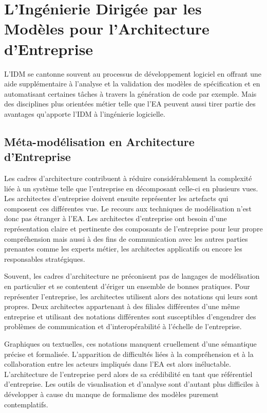 \section{L'Ingénierie Dirigée par les Modèles pour l'Architecture d'Entreprise}

L'IDM se cantonne souvent au processus de développement logiciel en offrant une aide supplémentaire à l'analyse et la validation des modèles de spécification et en automatisant certaines tâches à travers la génération de code par exemple. Mais des disciplines plus orientées métier telle que l'EA peuvent aussi tirer partie des avantages qu'apporte l'IDM à l'ingénierie logicielle. 

\subsection{Méta-modélisation en Architecture d'Entreprise}

Les cadres d'architecture contribuent à réduire considérablement la complexité liée à un système telle que l'entreprise en décomposant celle-ci en plusieurs vues. Les architectes d'entreprise doivent ensuite représenter les artefacts qui composent ces différentes vue. Le recours aux techniques de modélisation n'est donc pas étranger à l'EA. Les architectes d'entreprise ont besoin d'une représentation claire et pertinente des composants de l'entreprise pour leur propre compréhension mais aussi à des fins de communication avec les autres parties prenantes comme les experts métier, les architectes applicatifs ou encore les responsables stratégiques. 

Souvent, les cadres d'architecture ne préconisent pas de langages de modélisation en particulier et se contentent d'ériger un ensemble de bonnes pratiques. Pour représenter l'entreprise, les architectes utilisent alors des notations qui leurs sont propres. Deux architectes appartenant à des filiales différentes d'une même entreprise et utilisant des notations différentes sont susceptibles d'engendrer des problèmes de communication et d'interopérabilité à l'échelle de l'entreprise. 

Graphiques ou textuelles, ces notations manquent cruellement d'une sémantique précise et formalisée. L'apparition de difficultés liées à la compréhension et à la collaboration entre les acteurs impliqués dans l'EA est alors inéluctable. L'architecture de l'entreprise perd alors de sa crédibilité en tant que référentiel d'entreprise. Les outils de visualisation et d'analyse sont d'autant plus difficiles à développer à cause du manque de formalisme des modèles purement contemplatifs.

